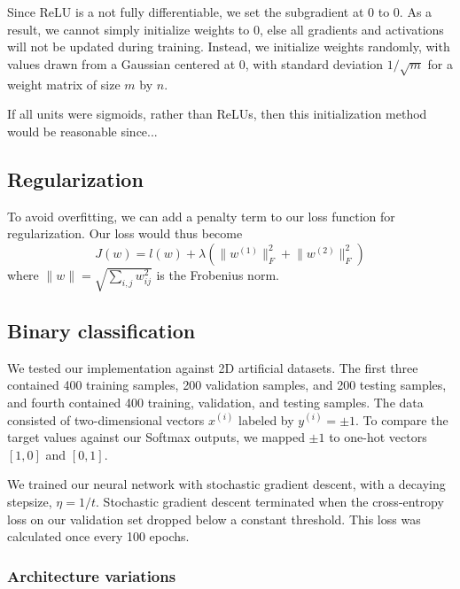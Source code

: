 \documentclass{article}
\newcommand{\sind}[1]{^{(#1)}}
\begin{document}
\begin{multicols}{2}
Since ReLU is a not fully differentiable, we set the subgradient at 0 to 0.
As a result, we cannot simply initialize weights to 0, else all gradients and activations 
will not be updated during training. Instead, we initialize weights randomly,
with values drawn from a Gaussian centered at 0, with standard deviation $1/\sqrt{m}$
for a weight matrix of size $m$ by $n$.

If all units were sigmoids, rather than ReLUs, then this initialization method would 
be reasonable since... %

\subsection{Regularization}

To avoid overfitting, we can add a penalty term to our loss function for regularization.
Our loss would thus become
\begin{equation}
    J(w) = l(w) +
      \lambda(\lVert w^{(1)} \rVert^2_F + \lVert w^{(2)} \rVert^2_F)
\end{equation}
where $\lVert w\rVert = \sqrt{\sum_{i,j}{w_{ij}^2}}$ is the Frobenius norm.

\subsection{Binary classification}

We tested our implementation against 2D artificial datasets.
The first three contained 400 training samples,
200 validation samples,
and 200 testing samples, and fourth contained 
400 training, validation, and testing samples.
The data consisted of two-dimensional vectors $x\sind{i}$ labeled by $y\sind{i} = \pm1$.
To compare the target values against our Softmax outputs, we mapped $\pm1$ to
one-hot vectors $[1,0]$ and $[0,1]$.

We trained our neural network with stochastic gradient descent, with a 
decaying stepsize, $\eta = 1/t$. Stochastic gradient descent terminated when
the cross-entropy loss on our validation set dropped below a constant threshold.
This loss was calculated once every 100 epochs.


\subsubsection{Architecture variations}


\end{multicols}
\end{document}
